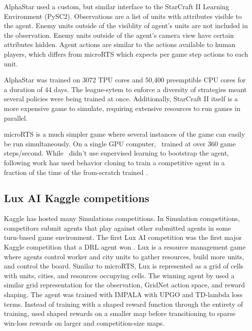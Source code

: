 \documentclass{article}
\begin{document}
AlphaStar used a custom, but similar interface to the StarCraft II Learning Environment
(PySC2). Observations are a list of units with attributes visible to the agent. Enemy
units outside of the visiblity of agent's units are not included in the observation.
Enemy units outside of the agent's camera view have certain attributes hidden. Agent
actions are similar to the actions available to human players, which differs from
microRTS which expects per game step actions to each unit.

AlphaStar was trained on 3072 TPU cores and 50,400 preemptible CPU cores for a duration of 44 days. The
league-sytem to enforce a diversity of strategies meant several policies were being
trained at once. Additionally, StarCraft II itself is a more expensive game to
simulate, requiring extensive resources to run games in parallel.

microRTS is a much simpler game where several instances of the game can easily be run
simultaneously. On a single GPU computer, \agentName\ trained at over 360 game
steps/second. While \agentName\ didn't use supervised learning to bootstrap the agent,
following work has used behavior cloning to train a competitive agent in a fraction of
the time of the from-scratch trained \agentName.

\subsection{Lux AI Kaggle competitions}
Kaggle has hosted many Simulations competitions. In Simulation competitions, competitors
submit agents that play against other submitted agents in some turn-based game
environment. The first Lux AI competition was the first major Kaggle competition that a
DRL agent won \citep{lux-ai-2021}. Lux is a resource management game where agents
control worker and city units to gather resources, build more units, and control the
board. Similar to microRTS, Lux is represented as a grid of cells with units, cities,
and resources occupying cells. The winning agent by \citet{lux-ai-2021-winner} used a
similar grid representation for the observation, GridNet action space, and reward
shaping. The agent was trained with IMPALA with UPGO and TD-lambda loss terms. Instead
of training with a shaped reward function through the entirety of training, \citet{lux-ai-2021-winner}
used shaped rewards on a smaller map before transitioning to sparse win-loss rewards on
larger and competition-size maps.
\end{document}
